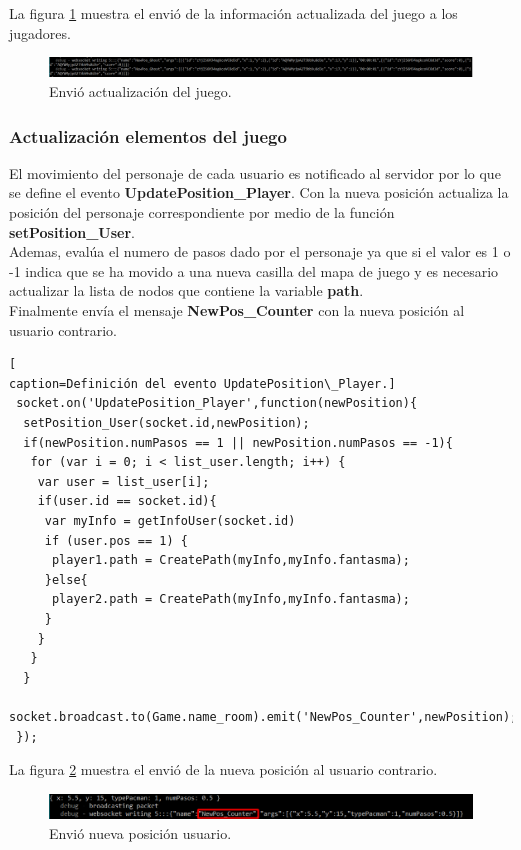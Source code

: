 La figura \ref{fig:Update_GhostPosition} muestra el envió de la información actualizada del juego a los jugadores.
\begin{figure}[!h]
\begin{center}
   \includegraphics[width=0.9\linewidth]{Figures/Update_GhostPosition}
	\decoRule
	\caption[Envio actualización del juego.]{Envió actualización del juego.}
\label{fig:Update_GhostPosition}
\end{center}
\end{figure}
\subsubsection{Actualización elementos del juego}
El movimiento del personaje de cada usuario es notificado al servidor por lo que se define el evento \textbf{UpdatePosition\_Player}. Con la nueva posición actualiza la posición del personaje correspondiente por medio de la función \textbf{setPosition\_User}.
\\Ademas, evalúa el numero de pasos dado por el personaje ya que si el valor es 1 o -1 indica que se ha movido a una nueva casilla del mapa de juego y es necesario actualizar la lista de nodos que contiene la variable \textbf{path}.
\\Finalmente envía el mensaje \textbf{NewPos\_Counter} con la nueva posición al usuario contrario.
\begin{lstlisting}[
caption=Definición del evento UpdatePosition\_Player.]
 socket.on('UpdatePosition_Player',function(newPosition){
  setPosition_User(socket.id,newPosition);
  if(newPosition.numPasos == 1 || newPosition.numPasos == -1){
   for (var i = 0; i < list_user.length; i++) {
    var user = list_user[i];
    if(user.id == socket.id){
     var myInfo = getInfoUser(socket.id)
     if (user.pos == 1) {
      player1.path = CreatePath(myInfo,myInfo.fantasma);
     }else{
      player2.path = CreatePath(myInfo,myInfo.fantasma);
     }
    }
   }
  }
  socket.broadcast.to(Game.name_room).emit('NewPos_Counter',newPosition);
 });
\end{lstlisting}
La figura \ref{fig:Server_NewPos_Counter} muestra el envió de la nueva posición al usuario contrario.
\begin{figure}[!h]
\begin{center}
   \includegraphics[width=0.9\linewidth]{Figures/Server_NewPos_Counter}
	\decoRule
	\caption[Envio actualización del juego.]{Envió nueva posición usuario.}
\label{fig:Server_NewPos_Counter}
\end{center}
\end{figure}
